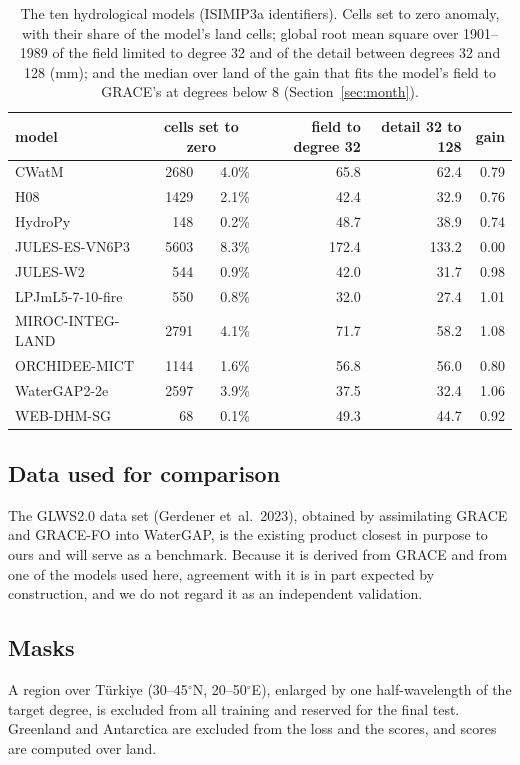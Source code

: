 \documentclass[11pt,a4paper]{article}
\begin{document}
\begin{table}[ht]
\centering\small
\caption{The ten hydrological models (ISIMIP3a identifiers). Cells set to zero anomaly, with
their share of the model's land cells; global root mean square over 1901--1989 of the field
limited to degree 32 and of the detail between degrees 32 and 128 (mm); and the median over
land of the gain that fits the model's field to GRACE's at degrees below 8
(Section~\ref{sec:month}).}
\label{tab:models}
\begin{tabular}{lrrrrr}
  \toprule
  model & \multicolumn{2}{c}{cells set to zero} & field to degree 32 & detail 32 to 128 & gain \\
  \midrule
  CWatM & 2680 & 4.0\% & 65.8 & 62.4 & 0.79 \\
  H08 & 1429 & 2.1\% & 42.4 & 32.9 & 0.76 \\
  HydroPy & 148 & 0.2\% & 48.7 & 38.9 & 0.74 \\
  JULES-ES-VN6P3 & 5603 & 8.3\% & 172.4 & 133.2 & 0.00 \\
  JULES-W2 & 544 & 0.9\% & 42.0 & 31.7 & 0.98 \\
  LPJmL5-7-10-fire & 550 & 0.8\% & 32.0 & 27.4 & 1.01 \\
  MIROC-INTEG-LAND & 2791 & 4.1\% & 71.7 & 58.2 & 1.08 \\
  ORCHIDEE-MICT & 1144 & 1.6\% & 56.8 & 56.0 & 0.80 \\
  WaterGAP2-2e & 2597 & 3.9\% & 37.5 & 32.4 & 1.06 \\
  WEB-DHM-SG & 68 & 0.1\% & 49.3 & 44.7 & 0.92 \\
  \bottomrule
\end{tabular}
\end{table}

\subsection{Data used for comparison}
The GLWS2.0 data set (Gerdener et~al.\ 2023), obtained by assimilating GRACE and GRACE-FO into
WaterGAP, is the existing product closest in purpose to ours and will serve as a benchmark.
Because it is derived from GRACE and from one of the models used here, agreement with it is
in part expected by construction, and we do not regard it as an independent validation.

\subsection{Masks}
A region over Türkiye (30--45$^\circ$N, 20--50$^\circ$E), enlarged by one half-wavelength of
the target degree, is excluded from all training and reserved for the final test. Greenland
and Antarctica are excluded from the loss and the scores, and scores are computed over land.
\end{document}
